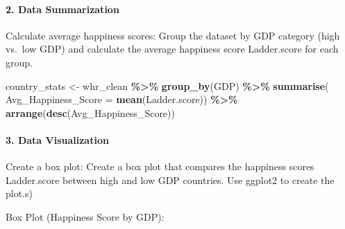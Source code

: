\documentclass[
]{article}
\newenvironment{Shaded}{\begin{snugshade}}{\end{snugshade}}
\newcommand{\AttributeTok}[1]{\textcolor[rgb]{0.13,0.29,0.53}{#1}}
\newcommand{\CommentTok}[1]{\textcolor[rgb]{0.56,0.35,0.01}{\textit{#1}}}
\newcommand{\FunctionTok}[1]{\textcolor[rgb]{0.13,0.29,0.53}{\textbf{#1}}}
\newcommand{\NormalTok}[1]{#1}
\newcommand{\OtherTok}[1]{\textcolor[rgb]{0.56,0.35,0.01}{#1}}
\newcommand{\SpecialCharTok}[1]{\textcolor[rgb]{0.81,0.36,0.00}{\textbf{#1}}}
\newcommand{\StringTok}[1]{\textcolor[rgb]{0.31,0.60,0.02}{#1}}
\begin{document}
\begin{Shaded}
\end{Shaded}

\paragraph{2. Data Summarization}\label{data-summarization}

Calculate average happiness scores: Group the dataset by GDP category
(high vs.~low GDP) and calculate the average happiness score
Ladder.score for each group.

\begin{Shaded}
\begin{Highlighting}[]
\NormalTok{country\_stats }\OtherTok{\textless{}{-}}\NormalTok{ whr\_clean }\SpecialCharTok{\%\textgreater{}\%}
    \FunctionTok{group\_by}\NormalTok{(GDP) }\SpecialCharTok{\%\textgreater{}\%}
    \FunctionTok{summarise}\NormalTok{(}
        \AttributeTok{Avg\_Happiness\_Score =} \FunctionTok{mean}\NormalTok{(Ladder.score)) }\SpecialCharTok{\%\textgreater{}\%}
    \FunctionTok{arrange}\NormalTok{(}\FunctionTok{desc}\NormalTok{(Avg\_Happiness\_Score))}
\end{Highlighting}
\end{Shaded}

\paragraph{3. Data Visualization}\label{data-visualization}

Create a box plot: Create a box plot that compares the happiness scores
Ladder.score between high and low GDP countries. Use ggplot2 to create
the plot.s)

Box Plot (Happiness Score by GDP):
\end{document}
